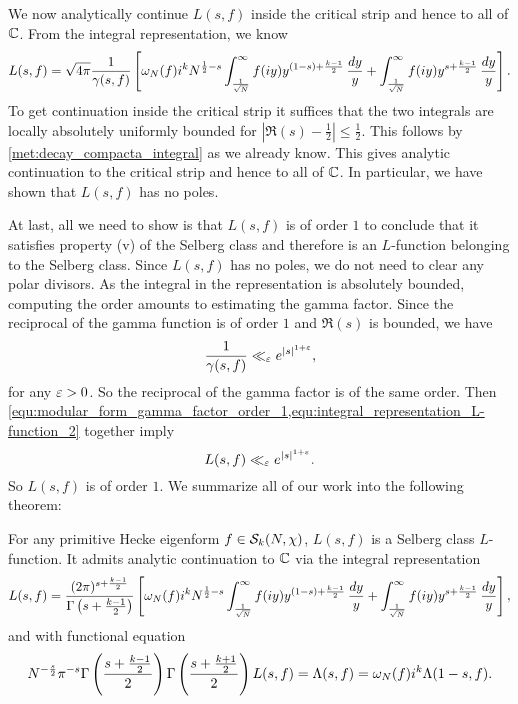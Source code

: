       We now analytically continue $L(s,f)$ inside the critical strip and hence to all of $\mathbb{C}$. From the integral representation, we know
      \begin{equation}\label{equ:integral_representation_L-function_2}
        L(s,f) = \sqrt{4\pi}\frac{1}{\gamma(s,f)}\left[\omega_{N}(f)i^{k}N^{\frac{1}{2}-s}\int_{\frac{1}{\sqrt{N}}}^{\infty}f(iy)y^{(1-s)+\frac{k-1}{2}}\,\frac{dy}{y}+\int_{\frac{1}{\sqrt{N}}}^{\infty}f(iy)y^{s+\frac{k-1}{2}}\,\frac{dy}{y}\right].
      \end{equation}
      To get continuation inside the critical strip it suffices that the two integrals are locally absolutely uniformly bounded for $|\Re(s)-\frac{1}{2}| \le \frac{1}{2}$. This follows by \cref{met:decay_compacta_integral} as we already know. This gives analytic continuation to the critical strip and hence to all of $\mathbb{C}$. In particular, we have shown that $L(s,f)$ has no poles.

      At last, all we need to show is that $L(s,f)$ is of order $1$ to conclude that it satisfies property (v) of the Selberg class and therefore is an $L$-function belonging to the Selberg class. Since $L(s,f)$ has no poles, we do not need to clear any polar divisors. As the integral in the representation is absolutely bounded, computing the order amounts to estimating the gamma factor. Since the reciprocal of the gamma function is of order $1$ and $\Re(s)$ is bounded, we have
      \begin{equation}\label{equ:modular_form_gamma_factor_order_1}
        \frac{1}{\gamma(s,f)} \ll_{\varepsilon} e^{|s|^{1+\varepsilon}},
      \end{equation}
      for any $\varepsilon > 0$. So the reciprocal of the gamma factor is of the same order. Then \cref{equ:modular_form_gamma_factor_order_1,equ:integral_representation_L-function_2} together imply
      \[
        L(s,f) \ll_{\varepsilon} e^{|s|^{1+\varepsilon}}.
      \]
      So $L(s,f)$ is of order $1$. We summarize all of our work into the following theorem:

      \begin{theorem}
        For any primitive Hecke eigenform $f \in \mathcal{S}_{k}(N,\chi)$, $L(s,f)$ is a Selberg class $L$-function. It admits analytic continuation to $\mathbb{C}$ via the integral representation
        \[
          L(s,f) = \frac{(2\pi)^{s+\frac{k-1}{2}}}{\Gamma\left(s+\frac{k-1}{2}\right)}\left[\omega_{N}(f)i^{k}N^{\frac{1}{2}-s}\int_{\frac{1}{\sqrt{N}}}^{\infty}f(iy)y^{(1-s)+\frac{k-1}{2}}\,\frac{dy}{y}+\int_{\frac{1}{\sqrt{N}}}^{\infty}f(iy)y^{s+\frac{k-1}{2}}\,\frac{dy}{y}\right],
        \]
        and with functional equation
        \[
          N^{-\frac{s}{2}}\pi^{-s}\Gamma\left(\frac{s+\frac{k-1}{2}}{2}\right)\Gamma\left(\frac{s+\frac{k+1}{2}}{2}\right)L(s,f) = \Lambda(s,f) = \omega_{N}(f)i^{k}\Lambda(1-s,f).
        \]
      \end{theorem}
